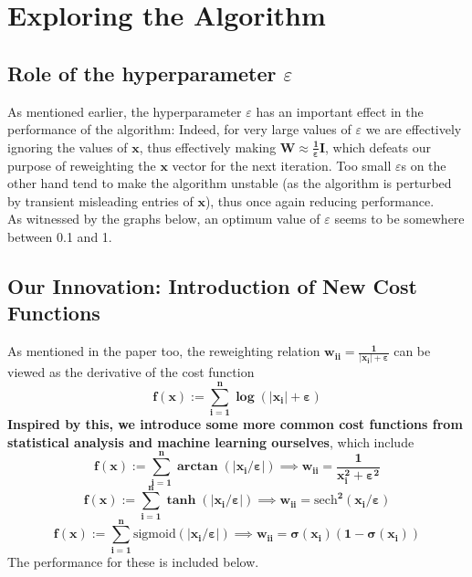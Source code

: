 \documentclass[a4paper,14pt]{article}
\numberwithin{definition}{section}
\numberwithin{mytheorem}{subsection}
\begin{document}
\section{Exploring the Algorithm}
\subsection{Role of the hyperparameter $\varepsilon$}
As mentioned earlier, the hyperparameter $\varepsilon$ has an important effect in the performance of the algorithm: Indeed, for very large values of $\varepsilon$ we are effectively ignoring the values of $\boldsymbol{x}$, thus effectively making $\boldsymbol{W \approx \frac{1}{\varepsilon}I}$, which defeats our purpose of reweighting the $\boldsymbol{x}$ vector for the next iteration. Too small $\varepsilon$s on the other hand tend to make the algorithm unstable (as the algorithm is perturbed by transient misleading entries of $\boldsymbol{x}$), thus once again reducing performance.\\
As witnessed by the graphs below, an optimum value of $\varepsilon$ seems to be somewhere between 0.1 and 1.


\subsection{Our Innovation: Introduction of New Cost Functions}
As mentioned in the paper too, the reweighting relation $\boldsymbol{w_{ii} = \frac{1}{|x_i|+\varepsilon}}$ can be viewed as the derivative of the cost function 
$$\boldsymbol{f(x) := \sum^{n}_{i = 1}\log (|x_i|+\varepsilon)}$$
\textbf{Inspired by this, we introduce some more common cost functions from statistical analysis and machine learning ourselves}, which include
$$\boldsymbol{f(x) := \sum^{n}_{i = 1}\arctan (|x_i/\varepsilon|)\implies w_{ii} = \frac{1}{x_i^2+\varepsilon^2}}$$
$$\boldsymbol{f(x) := \sum^{n}_{i = 1}\tanh (|x_i/\varepsilon|)\implies w_{ii} = \mathrm{sech}^2(x_i/\varepsilon)}$$
$$\boldsymbol{f(x) := \sum^{n}_{i = 1}\mathrm{sigmoid} (|x_i/\varepsilon|)\implies w_{ii} = \sigma(x_i)(1-\sigma(x_i))}$$
The performance for these is included below.
\end{document}
